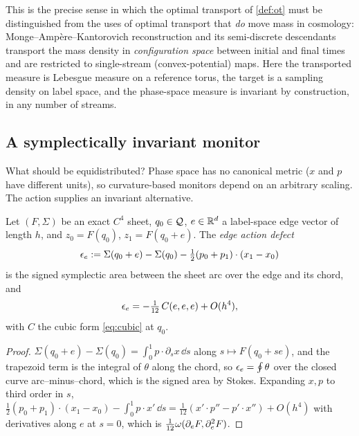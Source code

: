 This is the precise sense in which the optimal transport of \cref{def:ot} must be distinguished from the uses of
optimal transport that \emph{do} move mass in cosmology: Monge--Amp\`ere--Kantorovich reconstruction and its
semi-discrete descendants \cite{FrischEtAl2002,BrenierEtAl2003,LevyEtAl2021} transport the mass density in
\emph{configuration space} between initial and final times and are restricted to single-stream (convex-potential)
maps. Here the transported measure is Lebesgue measure on a reference torus, the target is a sampling density on
label space, and the phase-space measure is invariant by construction, in any number of streams.

\subsection{A symplectically invariant monitor}\label{sec:monitor}

What should be equidistributed? Phase space has no canonical metric ($x$ and $p$ have different units), so
curvature-based monitors depend on an arbitrary scaling. The action supplies an invariant alternative.

\begin{lemma}\label{lem:edge}
Let $(F,\Sigma)$ be an exact $C^4$ sheet, $q_0\in\mathcal{Q}$, $e\in\mathbb{R}^d$ a label-space edge vector of length $h$, and
$z_0=F(q_0)$, $z_1=F(q_0+e)$. The \emph{edge action defect}
\begin{equation}\label{eq:edgedefect}
\epsilon_e:=\Sigma(q_0+e)-\Sigma(q_0)-\tfrac12(p_0+p_1)\cdot(x_1-x_0)
\end{equation}
is the signed symplectic area between the sheet arc over the edge and its chord, and
\begin{equation}\label{eq:edgeexp}
\epsilon_e=-\tfrac1{12}\,C(e,e,e)+O(h^4),
\end{equation}
with $C$ the cubic form \eqref{eq:cubic} at $q_0$.
\end{lemma}
\begin{proof}
$\Sigma(q_0+e)-\Sigma(q_0)=\int_0^1p\cdot\partial_sx\,\dd s$ along $s\mapsto F(q_0+se)$, and the trapezoid term is the
integral of $\theta$ along the chord, so $\epsilon_e=\oint\theta$ over the closed curve arc--minus--chord, which is the
signed area by Stokes. Expanding $x,p$ to third order in $s$,
$\tfrac12(p_0+p_1)\cdot(x_1-x_0)-\int_0^1p\cdot x'\,\dd s=\tfrac1{12}(x'\cdot p''-p'\cdot x'')+O(h^4)$ with
derivatives along $e$ at $s=0$, which is $\tfrac1{12}\omega(\partial_eF,\partial_e^2F)$.
\end{proof}

